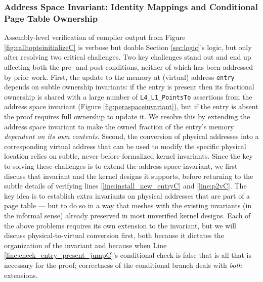 \subsubsection{Address Space Invariant: Identity Mappings and Conditional Page Table Ownership}
\label{subsec:identitymappingsC}
Assembly-level verification of compiler output from Figure \ref{fig:calltopteinitializeC} is verbose but doable
Section \ref{sec:logic}'s logic, but only after resolving two critical challenges.
Two key challenges stand out and end up affecting both the pre- and post-conditions, neither of which has been addressed by prior work.
First, the update to the memory at (virtual) address \lstinline|entry| depends on subtle ownership invariants:
if the entry is present then its fractional ownership is shared with a large number of \lstinline|L4_L1_PointsTo| assertions
from the address space invariant (Figure \ref{fig:peraspaceinvariant}),
but if the entry is absent the proof requires full ownership to update it. We resolve this by extending the address space invariant
to make the owned fraction of the entry's memory \emph{dependent on its own contents}.
Second, the conversion of physical addresses into a corresponding virtual address that can be used to modify the specific
physical location relies on subtle, never-before-formalized kernel invariants.
%
Since the key to solving these challenges is to extend the address space invariant, we
first discuss that invariant and the kernel designs it supports, before returning to the subtle details of
verifying lines \ref{line:install_new_entryC} and \ref{line:p2vC}.
The key idea is to establish extra invariants on physical addresses that are part of a page table ---
but to do so in a way that meshes with the existing invariants (in the informal sense) already preserved in most
unverified kernel designs.
Each of the above problems requires its own extension to the invariant, but we will discuss
physical-to-virtual conversion first, both because it dictates the organization of the invariant
and because when Line \ref{line:check_entry_present_jumpC}'s
conditional check is false that is all that is necessary for the proof; correctness of the conditional branch deals with \emph{both}
extensions.

